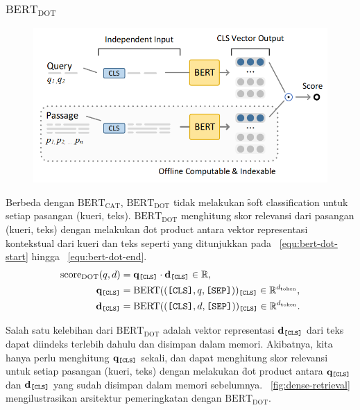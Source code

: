 		\subsubsection{$\text{BERT}_{\text{DOT}}$}
		\label{sec:bert-dot}
		\begin{figure}[!ht]
			\centering
			\includegraphics[width=1\textwidth]{assets/pics/bertdot.png}
			\label{fig:bert-dot}
		\end{figure}

		Berbeda dengan $\text{BERT}_{\text{CAT}}$, $\text{BERT}_{\text{DOT}}$ tidak melakukan \f{soft classification} untuk setiap pasangan (kueri, teks). $\text{BERT}_{\text{DOT}}$ menghitung skor relevansi dari pasangan (kueri, teks) dengan melakukan \f{dot product} antara vektor representasi kontekstual dari kueri dan teks seperti yang ditunjukkan pada \equ~\ref{equ:bert-dot-start} hingga \equ~\ref{equ:bert-dot-end}.
		\begin{align}
			\label{equ:bert-dot-start}
			\text{score}_{\text{DOT}}(q,d) &= \mathbf{q}_{\text{\texttt{[CLS]}}} \cdot \mathbf{d}_{\text{\texttt{[CLS]}}} \in \mathbb{R}, \\
			\mathbf{q}_{\text{\texttt{[CLS]}}} &= \text{BERT}((\text{\texttt{[CLS]}}, q, \text{\texttt{[SEP]}}))_{\text{\texttt{[CLS]}}} \in \mathbb{R}^{d_{\text{token}}}, \\
			\mathbf{d}_{\text{\texttt{[CLS]}}} &= \text{BERT}((\text{\texttt{[CLS]}}, d, \text{\texttt{[SEP]}}))_{\text{\texttt{[CLS]}}} \in \mathbb{R}^{d_{\text{token}}}.
			\label{equ:bert-dot-end}
		\end{align}

		Salah satu kelebihan dari $\text{BERT}_{\text{DOT}}$ adalah vektor representasi $\mathbf{d}_{\text{\texttt{[CLS]}}}$ dari teks dapat diindeks terlebih dahulu dan disimpan dalam memori. Akibatnya, kita hanya perlu menghitung $\mathbf{q}_{\text{\texttt{[CLS]}}}$ sekali, dan dapat menghitung skor relevansi untuk setiap pasangan (kueri, teks) dengan melakukan \f{dot product} antara $\mathbf{q}_{\text{\texttt{[CLS]}}}$ dan $\mathbf{d}_{\text{\texttt{[CLS]}}}$ yang sudah disimpan dalam memori sebelumnya. \pic~\ref{fig:dense-retrieval} mengilustrasikan arsitektur pemeringkatan dengan $\text{BERT}_{\text{DOT}}$.



